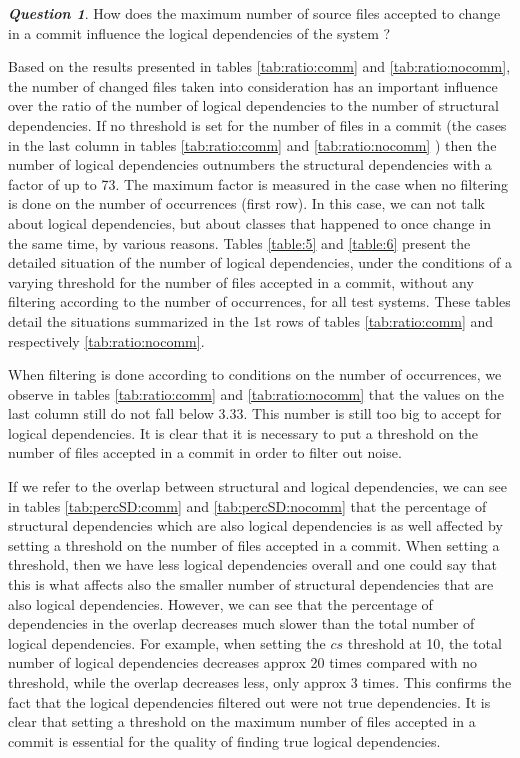 \documentclass[conference]{IEEEtran}
\begin{document}
\textit{\textbf{Question 1}}. How does the maximum number of source files accepted to change in a commit influence the logical dependencies of the system ?

Based on the results presented in tables \ref{tab:ratio:comm} and \ref{tab:ratio:nocomm}, the number 
of changed files taken into consideration has an important influence over the ratio of the number  of 
logical dependencies to the number of structural dependencies.  If no threshold is set for the number of files in a commit (the cases in the last column in tables \ref{tab:ratio:comm} and 
\ref{tab:ratio:nocomm} ) then the number of logical dependencies outnumbers the structural dependencies with a factor of up to 73. The maximum factor is measured in the case when no filtering is done on the number of occurrences (first row).  
In this case, we can not talk about logical dependencies, but about classes that happened to once change in the same time, by various reasons. Tables \ref{table:5} and \ref{table:6}  present the detailed situation of the number of logical dependencies, under the conditions of a varying threshold for the number of files accepted in a commit, without any filtering according to the number of occurrences, for all test systems. These tables detail the situations summarized in the 1st rows of tables \ref{tab:ratio:comm} and respectively \ref{tab:ratio:nocomm}. 

When filtering is done according to conditions on the number of occurrences, we observe in tables \ref{tab:ratio:comm} and \ref{tab:ratio:nocomm} that the values on the last column still do not fall below 3.33. This number is still too big to accept for logical dependencies.  It is clear that it is necessary to  put a threshold on the number of files accepted in a commit in order to filter out noise.


If we refer to the overlap between structural and logical dependencies, we can see in tables \ref{tab:percSD:comm} and \ref{tab:percSD:nocomm} that the percentage of structural dependencies which are also logical dependencies is as well affected by setting a threshold on the number of files accepted in a commit. When setting a threshold, then we have less logical dependencies overall and one could say that this is what affects also the smaller number of structural dependencies that are also logical dependencies. However, we can see that the percentage of dependencies in the overlap decreases much slower than the total number of logical dependencies. For example, when setting  the $cs$ threshold at 10, the total number of logical dependencies decreases approx 20 times compared with no threshold, while the overlap decreases less, only approx 3 times. This confirms the fact that the logical dependencies filtered out were not true dependencies. It is clear that setting a threshold on the maximum number of files accepted in a commit is essential for the quality of finding true logical dependencies.
\end{document}
